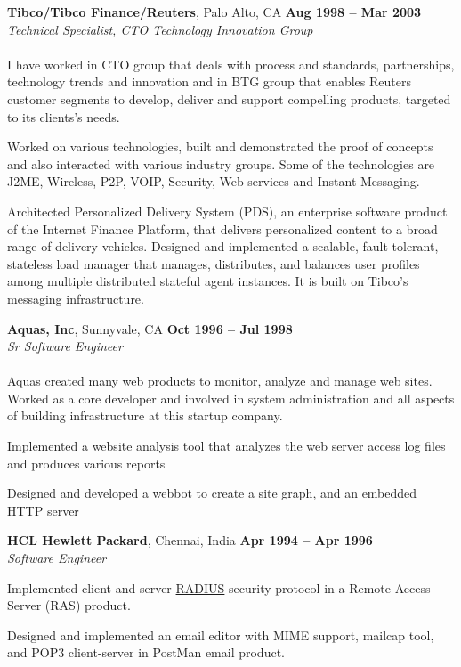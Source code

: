 \documentclass[margin,line]{resume}
\begin{document}
\begin{resume}
    \textbf{Tibco/Tibco Finance/Reuters}, Palo Alto, CA  \hfill \textbf{Aug 1998 -- Mar 2003}\\
    \textsl{Technical Specialist, CTO Technology Innovation Group}\\\\
I have worked in CTO group that deals with process and standards, partnerships, technology trends and innovation and in BTG group that enables Reuters customer segments to develop, deliver and support compelling products, targeted to its clients's needs.

    \begin{list2}
    \item Worked on various technologies, built and demonstrated the proof of concepts and also interacted with various industry groups. Some of the technologies are J2ME, Wireless, P2P, VOIP, Security, Web services and Instant Messaging.
    \item Architected Personalized Delivery System (PDS), an enterprise software product of the Internet Finance Platform, that delivers personalized content to a broad range of delivery vehicles. Designed and implemented a scalable, fault-tolerant, stateless load manager that manages, distributes, and balances user profiles among multiple distributed stateful agent instances. It is built on Tibco's messaging infrastructure.
    \end{list2}\vspace{-1.5mm}

    \textbf{Aquas, Inc}, Sunnyvale, CA \hfill \textbf{Oct 1996 -- Jul 1998}\\ 
    \textsl{Sr Software Engineer}\\\\ 
Aquas created many web products to monitor, analyze and manage web sites. Worked as a core developer and involved in system administration and all aspects of building infrastructure at this startup company.
    \begin{list2}
    \item Implemented a website analysis tool that analyzes the web server access log files and produces various reports
    \item Designed and developed a webbot to create a site graph, and an embedded HTTP server
    \end{list2}\vspace{-1.5mm}


    \textbf{HCL Hewlett Packard}, Chennai, India \hfill \textbf{Apr 1994 -- Apr 1996}\\
    \textsl{Software Engineer}\\
    \begin{list2}
    \item Implemented client and server \href{http://www.ietf.org/rfc/rfc2865.txt}{RADIUS} security protocol in a Remote Access Server (RAS) product.
    \item Designed and implemented an email editor with MIME support, mailcap tool, and POP3 client-server in PostMan email product.
    \end{list2}\vspace{-1.5mm}



\end{resume}
\end{document}
